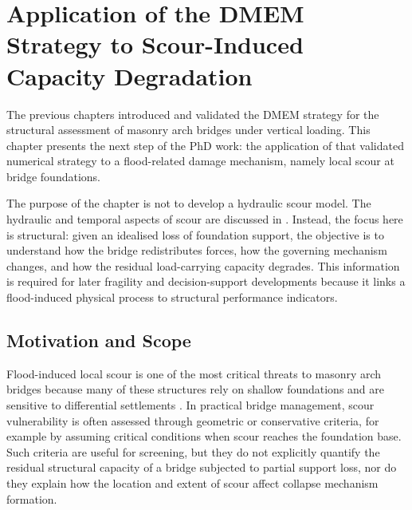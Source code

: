 

\chapter{Application of the DMEM Strategy to Scour-Induced Capacity Degradation}
\label{cha:dmem-scour-application}

The previous chapters introduced and validated the \gls{DMEM} strategy for the structural assessment of masonry arch bridges under vertical loading. This chapter presents the next step of the PhD work: the application of that validated numerical strategy to a flood-related damage mechanism, namely local scour at bridge foundations.

The purpose of the chapter is not to develop a hydraulic scour model. The hydraulic and temporal aspects of scour are discussed in . Instead, the focus here is structural: given an idealised loss of foundation support, the objective is to understand how the bridge redistributes forces, how the governing mechanism changes, and how the residual load-carrying capacity degrades. This information is required for later fragility and decision-support developments because it links a flood-induced physical process to structural performance indicators.

\section{Motivation and Scope}
\label{sec:dmem-scour-motivation}

Flood-induced local scour is one of the most critical threats to masonry arch bridges because many of these structures rely on shallow foundations and are sensitive to differential settlements \cite{Kirby2015,Tubaldi2018}. In practical bridge management, scour vulnerability is often assessed through geometric or conservative criteria, for example by assuming critical conditions when scour reaches the foundation base. Such criteria are useful for screening, but they do not explicitly quantify the residual structural capacity of a bridge subjected to partial support loss, nor do they explain how the location and extent of scour affect collapse mechanism formation.

